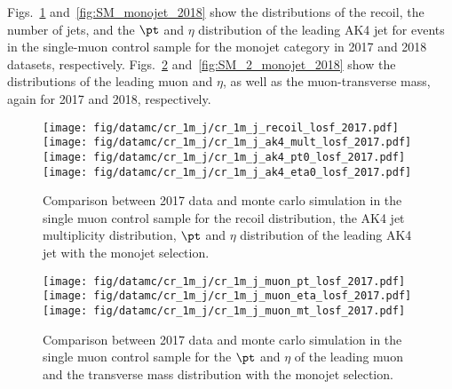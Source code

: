 Figs.~\ref{fig:SM_monojet_2017} and~\ref{fig:SM_monojet_2018} show the distributions of the recoil, the number of jets, and the $\pt$ and $\eta$ distribution of the leading AK4  jet
for events in the single-muon control sample for the monojet category in 2017 and 2018 datasets, respectively. Figs.~\ref{fig:SM_2_monojet_2017} and~\ref{fig:SM_2_monojet_2018} show the distributions of the leading muon \pt and $\eta$, as well as the muon-\ptmiss transverse mass, again for 2017 and 2018, respectively.


\begin{figure}[htbp]
    \begin{center}
        \texttt{[image: fig/datamc/cr\_1m\_j/cr\_1m\_j\_recoil\_losf\_2017.pdf]}
        \texttt{[image: fig/datamc/cr\_1m\_j/cr\_1m\_j\_ak4\_mult\_losf\_2017.pdf]} \\
        \texttt{[image: fig/datamc/cr\_1m\_j/cr\_1m\_j\_ak4\_pt0\_losf\_2017.pdf]}
        \texttt{[image: fig/datamc/cr\_1m\_j/cr\_1m\_j\_ak4\_eta0\_losf\_2017.pdf]}
    \end{center}
    \caption{Comparison between 2017 data and monte carlo simulation in the single muon control sample for
        the recoil distribution, the AK4 jet multiplicity distribution,  $\pt$ and $\eta$ distribution
        of the leading AK4  jet with the monojet selection.}
    \label{fig:SM_monojet_2017}
\end{figure}

\begin{figure}[htbp]
    \begin{center}
        \texttt{[image: fig/datamc/cr\_1m\_j/cr\_1m\_j\_muon\_pt\_losf\_2017.pdf]}
        \texttt{[image: fig/datamc/cr\_1m\_j/cr\_1m\_j\_muon\_eta\_losf\_2017.pdf]} \\
        \texttt{[image: fig/datamc/cr\_1m\_j/cr\_1m\_j\_muon\_mt\_losf\_2017.pdf]}
    \end{center}
    \caption{Comparison between 2017 data and monte carlo simulation in the single muon control sample for
        the $\pt$ and $\eta$ of the leading muon and the transverse mass distribution with the monojet selection.}
    \label{fig:SM_2_monojet_2017}
\end{figure}


